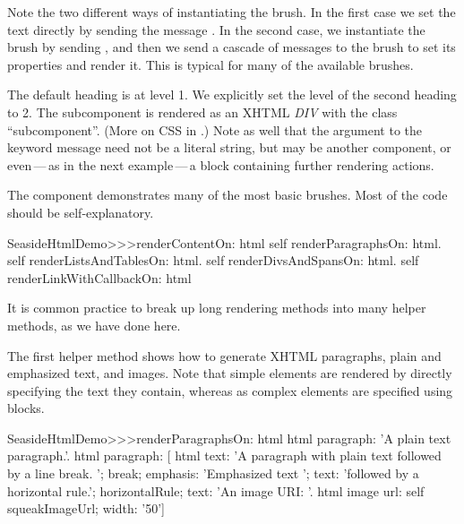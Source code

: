 \documentclass[a4paper,10pt,twoside]{book}
\begin{document}
Note the two different ways of instantiating the  brush.
In the first case we set the text directly by sending the message .
In the second case, we instantiate the brush by sending , and then we send a cascade of messages to the brush to set its properties and render it.
This is typical for many of the available brushes.



The default heading is at level 1.
We explicitly set the level of the second heading to 2.
The subcomponent is rendered as an XHTML \emph{DIV} with the  class ``subcomponent''.
(More on CSS in .)
Note as well that the argument to the  keyword message need not be a literal string, but may be another component, or even\,---\,as in the next example\,---\,a block containing further rendering actions.

The  component demonstrates many of the most basic brushes.
Most of the code should be self-explanatory.

\begin{code}{}
SeasideHtmlDemo>>>renderContentOn: html 
	self renderParagraphsOn: html.
	self renderListsAndTablesOn: html.
	self renderDivsAndSpansOn: html.
	self renderLinkWithCallbackOn: html
\end{code}

It is common practice to break up long rendering methods into many helper methods, as we have done here.


The first helper method shows how to generate XHTML paragraphs, plain and emphasized text, and images.
Note that simple elements are rendered by directly specifying the text they contain, whereas as complex elements are specified using blocks.

\begin{code}{}
SeasideHtmlDemo>>>renderParagraphsOn: html 
	html paragraph: 'A plain text paragraph.'.
	html paragraph: [
		html
			text: 'A paragraph with plain text followed by a line break. ';
			break;
			emphasis: 'Emphasized text ';
			text: 'followed by a horizontal rule.';
			horizontalRule;
			text: 'An image URI: '.
		html image
			url: self squeakImageUrl;
			width: '50']
\end{code}
\end{document}
